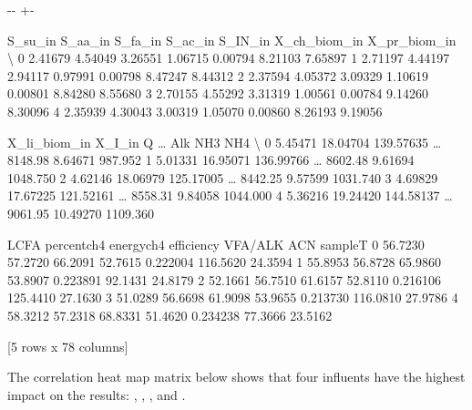 \documentclass[a4paper,10pt,english]{sphinxmanual}
\newlength\nbsphinxcodecellspacing
\begin{document}
{

\kern-\sphinxverbatimsmallskipamount\kern-\baselineskip
\kern+\FrameHeightAdjust\kern-\fboxrule
\vspace{\nbsphinxcodecellspacing}

\begin{sphinxVerbatim}[commandchars=\\\{\}]
\llap{\color{nbsphinxout}[10]:\,\hspace{\fboxrule}\hspace{\fboxsep}}   S\_su\_in  S\_aa\_in  S\_fa\_in  S\_ac\_in  S\_IN\_in  X\_ch\_biom\_in  X\_pr\_biom\_in  \textbackslash{}
0  2.41679  4.54049  3.26551  1.06715  0.00794       8.21103       7.65897
1  2.71197  4.44197  2.94117  0.97991  0.00798       8.47247       8.44312
2  2.37594  4.05372  3.09329  1.10619  0.00801       8.84280       8.55680
3  2.70155  4.55292  3.31319  1.00561  0.00784       9.14260       8.30096
4  2.35939  4.30043  3.00319  1.05070  0.00860       8.26193       9.19056

   X\_li\_biom\_in    X\_I\_in          Q  {\ldots}     Alk       NH3       NH4   \textbackslash{}
0       5.45471  18.04704  139.57635  {\ldots}  8148.98   8.64671   987.952
1       5.01331  16.95071  136.99766  {\ldots}  8602.48   9.61694  1048.750
2       4.62146  18.06979  125.17005  {\ldots}  8442.25   9.57599  1031.740
3       4.69829  17.67225  121.52161  {\ldots}  8558.31   9.84058  1044.000
4       5.36216  19.24420  144.58137  {\ldots}  9061.95  10.49270  1109.360

     LCFA    percentch4    energych4   efficiency   VFA/ALK       ACN  sampleT
0  56.7230       57.2720      66.2091     52.7615  0.222004  116.5620  24.3594
1  55.8953       56.8728      65.9860     53.8907  0.223891   92.1431  24.8179
2  52.1661       56.7510      61.6157     52.8110  0.216106  125.4410  27.1630
3  51.0289       56.6698      61.9098     53.9655  0.213730  116.0810  27.9786
4  58.3212       57.2318      68.8331     51.4620  0.234238   77.3666  23.5162

[5 rows x 78 columns]
\end{sphinxVerbatim}
}

\sphinxAtStartPar
The correlation heat map matrix below shows that four influents have the highest impact on the results: , , , and .
\end{document}
